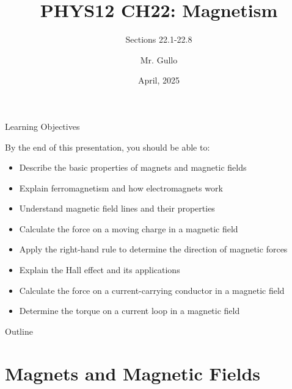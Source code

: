 \documentclass{beamer}
\title[CH22 Magnetism]{PHYS12 CH22: Magnetism}
\subtitle{Sections 22.1-22.8}
\author[Mr. Gullo]{Mr. Gullo}
\date[April 2025]{April, 2025}
\begin{document}
\begin{frame}
\titlepage
\end{frame}

\begin{frame}{Learning Objectives}
\begin{block}{By the end of this presentation, you should be able to:}
\begin{itemize}
\item Describe the basic properties of magnets and magnetic fields
\item Explain ferromagnetism and how electromagnets work
\item Understand magnetic field lines and their properties
\item Calculate the force on a moving charge in a magnetic field
\item Apply the right-hand rule to determine the direction of magnetic forces
\item Explain the Hall effect and its applications
\item Calculate the force on a current-carrying conductor in a magnetic field
\item Determine the torque on a current loop in a magnetic field
\end{itemize}
\end{block}
\end{frame}

\begin{frame}{Outline}
\tableofcontents
\end{frame}

\section{Magnets and Magnetic Fields}
\end{document}
